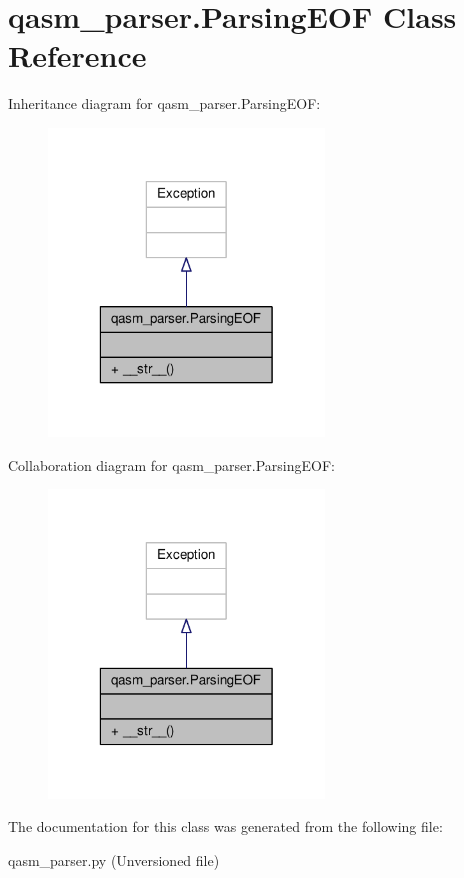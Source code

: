 \hypertarget{classqasm__parser_1_1ParsingEOF}{\section{qasm\-\_\-parser.\-Parsing\-E\-O\-F Class Reference}
\label{classqasm__parser_1_1ParsingEOF}
}


Inheritance diagram for qasm\-\_\-parser.\-Parsing\-E\-O\-F\-:
\nopagebreak
\begin{figure}[H]
\begin{center}
\leavevmode
\includegraphics[width=208pt]{dd/da0/classqasm__parser_1_1ParsingEOF__inherit__graph}
\end{center}
\end{figure}


Collaboration diagram for qasm\-\_\-parser.\-Parsing\-E\-O\-F\-:
\nopagebreak
\begin{figure}[H]
\begin{center}
\leavevmode
\includegraphics[width=208pt]{da/de2/classqasm__parser_1_1ParsingEOF__coll__graph}
\end{center}
\end{figure}


The documentation for this class was generated from the following file\-:\begin{DoxyCompactItemize}
\item 
qasm\-\_\-parser.\-py (\-Unversioned file)\end{DoxyCompactItemize}
